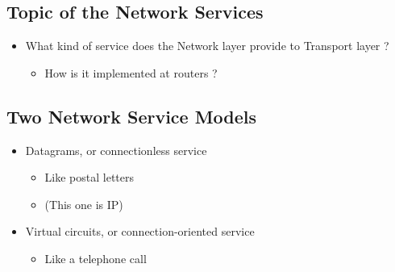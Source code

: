 \documentclass[12pt]{ctexart}   %
\begin{document}
	\subsection{Topic of the Network Services}
	\begin{itemize}
		\item What kind of service does the Network layer provide to Transport layer ?
		\begin{itemize}
			\item How is it implemented at routers ?
		\end{itemize}
	\end{itemize}
	
	\subsection{Two Network Service Models}
	\begin{itemize}
		\item Datagrams, or connectionless service
		\begin{itemize}
			\item Like postal letters
			\item (This one is IP)
		\end{itemize}
		
		\item Virtual circuits, or connection-oriented service
		\begin{itemize}
			\item Like a telephone call
		\end{itemize}
	\end{itemize}
	
\end{document}
